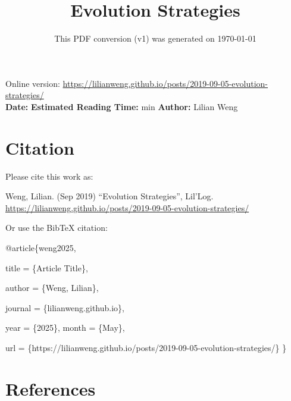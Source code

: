\documentclass[12pt]{article}
\title{Evolution Strategies}
\date{This PDF conversion (v1) was generated on \today\footnotemark}
\begin{document}
\maketitle
\begin{center}
    Online version: \url{https://lilianweng.github.io/posts/2019-09-05-evolution-strategies/} \\
    \textbf{Date:} \quad
    \textbf{Estimated Reading Time:}  min \quad
    \textbf{Author:} Lilian Weng
\end{center}




\newpage
\tableofcontents
\newpage
\vspace{1em}
\n\n\n\section{Citation}
Please cite this work as:

\begin{tcolorbox}[colback=black!5!white, colframe=black!80!white, boxrule=0.5pt, arc=2mm, left=1mm, right=1mm, top=1mm, bottom=1mm]
  Weng, Lilian. (Sep 2019) ``Evolution Strategies'', Lil'Log. \url{https://lilianweng.github.io/posts/2019-09-05-evolution-strategies/}
  \end{tcolorbox}

Or use the BibTeX citation:

\begin{tcolorbox}[
    colback=black!5!white,
    colframe=black!80!white,
    boxrule=0.5pt,
    arc=2mm,
    left=1mm,
    right=1mm,
    top=1mm,
    bottom=1mm,
    listing only,
    listing options={
      basicstyle=\ttfamily\footnotesize,
      breaklines=true,
      literate={\{}{{\char`\{}}1 {\}}{{\char`\}}}1
    }
  ]
  @article\{weng2025,

    title   = \{Article Title\},

    author  = \{Weng, Lilian\},

    journal = \{lilianweng.github.io\},

    year    = \{2025\},
    month   = \{May\},

    url     = \{https://lilianweng.github.io/posts/2019-09-05-evolution-strategies/\}\n
  \}
  \end{tcolorbox}

\newpage
\section{References}

\n
\end{document}
